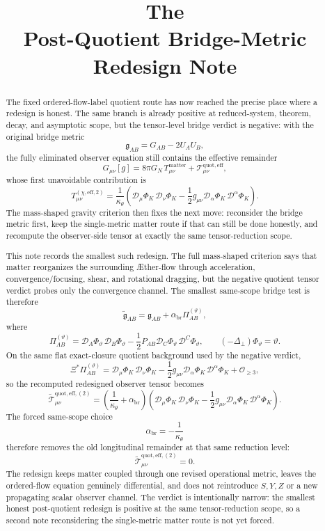 \documentclass[11pt]{article}
\title{\textbf{The \TheoryName{}}\\[0.4em]
\large Post-Quotient Bridge-Metric Redesign Note}
\author{}
\date{}
\newcommand{\Aflow}{\AE{}ther-flow}
\newcommand{\BridgeMetric}{\mathfrak{g}}
\newcommand{\ReBridge}{\widetilde{\mathfrak{g}}}
\newcommand{\Proj}{\mathcal D}
\newcommand{\Dperp}{\mathcal D}
\newcommand{\EffAux}{\mathcal T_{\mu\nu}^{\mathrm{quot,eff}}}
\newcommand{\ReEffAux}{\widetilde{\mathcal T}_{\mu\nu}^{\mathrm{quot,eff},(2)}}
\newcommand{\PiTheta}{\Pi^{(\vartheta)}}
\begin{document}
\maketitle

\begin{abstract}
The fixed ordered-flow-label quotient route has now reached the precise place where a redesign is honest. The same branch is already positive at reduced-system, theorem, decay, and asymptotic scope, but the tensor-level bridge verdict is negative: with the original bridge metric
\[
\BridgeMetric_{AB}=G_{AB}-2U_AU_B,
\]
the fully eliminated observer equation still contains the effective remainder
\[
G_{\mu\nu}[g]
=
8\pi G_N\,T_{\mu\nu}^{\mathrm{matter}}
+ \EffAux,
\]
whose first unavoidable contribution is
\[
T_{\mu\nu}^{(\chi,\mathrm{eff},2)}
=
\frac{1}{\kappa_\theta}
\left(
\Dperp_\mu\Phi_K\,\Dperp_\nu\Phi_K
-\frac12 g_{\mu\nu}\Dperp_\alpha\Phi_K\,\Dperp^\alpha\Phi_K
\right).
\]
The mass-shaped gravity criterion then fixes the next move: reconsider the bridge metric first, keep the single-metric matter route if that can still be done honestly, and recompute the observer-side tensor at exactly the same tensor-reduction scope.

This note records the smallest such redesign. The full mass-shaped criterion says that matter reorganizes the surrounding \Aflow{} through acceleration, convergence/focusing, shear, and rotational dragging, but the negative quotient tensor verdict probes only the convergence channel. The smallest same-scope bridge test is therefore
\[
\ReBridge_{AB}
=
\BridgeMetric_{AB}
+ \alpha_{\mathrm{br}}\PiTheta_{AB},
\]
where
\[
\PiTheta_{AB}
=
\Proj_A\Phi_\vartheta\,\Proj_B\Phi_\vartheta
-\frac12 P_{AB}\Proj_C\Phi_\vartheta\,\Proj^C\Phi_\vartheta,
\qquad
(-\Delta_\perp)\Phi_\vartheta=\vartheta.
\]
On the same flat exact-closure quotient background used by the negative verdict,
\[
\Xi^\ast\PiTheta_{AB}
=
\Dperp_\mu\Phi_K\,\Dperp_\nu\Phi_K
-\frac12 g_{\mu\nu}\Dperp_\alpha\Phi_K\,\Dperp^\alpha\Phi_K
+\mathcal O_{\ge 3},
\]
so the recomputed redesigned observer tensor becomes
\[
\ReEffAux
=
\left(\frac{1}{\kappa_\theta}+\alpha_{\mathrm{br}}\right)
\left(
\Dperp_\mu\Phi_K\,\Dperp_\nu\Phi_K
-\frac12 g_{\mu\nu}\Dperp_\alpha\Phi_K\,\Dperp^\alpha\Phi_K
\right).
\]
The forced same-scope choice
\[
\alpha_{\mathrm{br}}=-\frac{1}{\kappa_\theta}
\]
therefore removes the old longitudinal remainder at that same reduction level:
\[
\ReEffAux=0.
\]
The redesign keeps matter coupled through one revised operational metric, leaves the ordered-flow equation genuinely differential, and does not reintroduce \(S,Y,Z\) or a new propagating scalar observer channel. The verdict is intentionally narrow: the smallest honest post-quotient redesign is positive at the same tensor-reduction scope, so a second note reconsidering the single-metric matter route is not yet forced.
\end{abstract}
\end{document}
